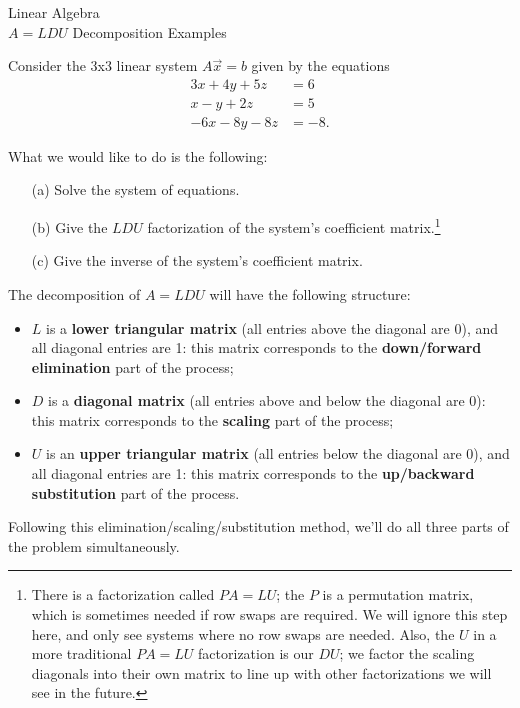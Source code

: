 \documentclass[10pt]{article}
\begin{document}


\begin{center}
Linear Algebra\\
$A = LDU$ Decomposition Examples
\end{center}


Consider the 3x3 linear system $A\vec{x} = b$ given by the equations 
\begin{align*}
3x + 4y + 5z & = 6 \\
x - y + 2z & = 5 \\
-6x - 8y - 8z & = -8.
\end{align*}

What we would like to do is the following: 
\begin{itemize}
\item[(a) ] Solve the system of equations. 
\item[(b) ] Give the $LDU$ factorization of the system's coefficient matrix.\footnote{There is a factorization called $PA = LU$; the $P$ is a permutation matrix, which is sometimes needed if row swaps are required. We will ignore this step here, and only see systems where no row swaps are needed. Also, the $U$ in a more traditional $PA = LU$ factorization is our $DU$; we factor the scaling diagonals into their own matrix to line up with other factorizations we will see in the future.}
\item[(c) ] Give the inverse of the system's coefficient matrix.
\end{itemize}

The decomposition of $A = LDU$ will have the following structure: 
\begin{itemize}
\item $L$ is a \textbf{lower triangular matrix} (all entries above the diagonal are 0), and all diagonal entries are 1: this matrix corresponds to the \textbf{down/forward elimination} part of the process;
\item $D$ is a \textbf{diagonal matrix} (all entries above and below the diagonal are 0): this matrix corresponds to the \textbf{scaling} part of the process; 
\item $U$ is an \textbf{upper triangular matrix} (all entries below the diagonal are 0), and all diagonal entries are 1: this matrix corresponds to the \textbf{up/backward substitution} part of the process.
\end{itemize}
Following this elimination/scaling/substitution method, we'll do all three parts of the problem simultaneously.
\end{document}
